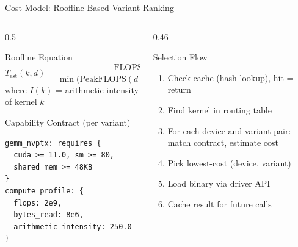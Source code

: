 \documentclass[aspectratio=169,10pt]{beamer}
\begin{document}
\begin{frame}[fragile]{Cost Model: Roofline-Based Variant Ranking}
  \begin{columns}[T]
    \begin{column}{0.5\textwidth}
      \begin{block}{Roofline Equation}
        \vspace{0.3em}
        \[
        T_{\text{est}}(k, d) = \frac{\text{FLOPS}(k)}{\min\!\big(\text{PeakFLOPS}(d),\;\text{BW}(d) \cdot I(k)\big)}
        \]
        \vspace{0.3em}
        where $I(k)$ = arithmetic intensity of kernel $k$
      \end{block}
      \vspace{0.5em}
      \begin{exampleblock}{Capability Contract (per variant)}
        \begin{lstlisting}[language={},basicstyle=\ttfamily\tiny,backgroundcolor=\color{LLVMlightteal}]
gemm_nvptx: requires {
  cuda >= 11.0, sm >= 80,
  shared_mem >= 48KB
}
compute_profile: {
  flops: 2e9,
  bytes_read: 8e6,
  arithmetic_intensity: 250.0
}
        \end{lstlisting}
      \end{exampleblock}
    \end{column}
    \begin{column}{0.46\textwidth}
      \begin{block}{Selection Flow}
        \begin{enumerate}
          \item Check cache (hash lookup), hit = return
          \item Find kernel in routing table
          \item For each device and variant pair: match contract, estimate cost
          \item Pick lowest-cost (device, variant)
          \item Load binary via driver API
          \item Cache result for future calls
        \end{enumerate}
      \end{block}
      \vspace{0.3em}
    \end{column}
  \end{columns}
\end{frame}
\end{document}
